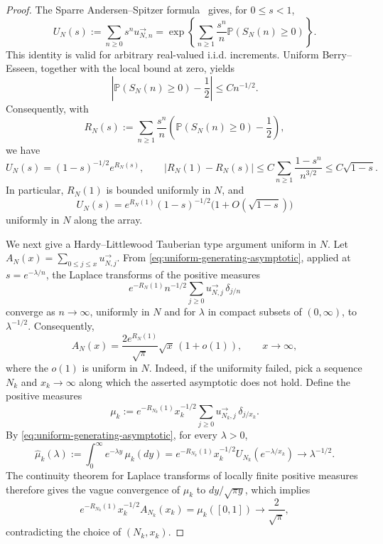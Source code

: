 \documentclass[11pt]{article}
\theoremstyle{plain}
\theoremstyle{definition}
\theoremstyle{remark}
\newcommand{\Pp}{\mathbb P}
\begin{document}
\begin{proof}
The Sparre
Andersen--Spitzer formula~\cite[Equation~(2.2)]{AurzadaSimon} gives, for
\(0\le s<1\),
\begin{equation*}
 U_N(s):=\sum_{n\ge0}s^n u_{N,n}^{\rightarrow}
 =
 \exp\left\{
   \sum_{n\ge1}\frac{s^n}{n}\Pp(S_N(n)\ge0)
 \right\}.
\end{equation*}
This identity is valid for arbitrary real-valued i.i.d. increments.  Uniform Berry--Esseen, together
with the local bound at zero, yields
\begin{equation*}
 \left|\Pp(S_N(n)\ge0)-\frac12\right|
 \le Cn^{-1/2}.
\end{equation*}
Consequently, with
\[
 R_N(s):=\sum_{n\ge1}\frac{s^n}{n}
 \left(\Pp(S_N(n)\ge0)-\frac12\right),
\]
we have
\begin{equation*}
 U_N(s)=(1-s)^{-1/2}e^{R_N(s)},
 \qquad
 |R_N(1)-R_N(s)|
 \le C\sum_{n\ge1}\frac{1-s^n}{n^{3/2}}
 \le C\sqrt{1-s}.
\end{equation*}
In particular, \(R_N(1)\) is bounded uniformly in \(N\), and
\begin{equation}
 U_N(s)=e^{R_N(1)}(1-s)^{-1/2}
 \bigl(1+O(\sqrt{1-s})\bigr)
 \label{eq:uniform-generating-asymptotic}
\end{equation}
uniformly in $N$ along the array.

We next give a Hardy--Littlewood Tauberian type argument uniform in \(N\).
Let
\(A_N(x)=\sum_{0\le j\le x}u_{N,j}^{\rightarrow}\).  From
\eqref{eq:uniform-generating-asymptotic}, applied at
\(s=e^{-\lambda/n}\), the Laplace transforms of the positive measures
\[
 e^{-R_N(1)}n^{-1/2}
 \sum_{j\ge0}u_{N,j}^{\rightarrow}\,\delta_{j/n}
\]
converge as $n\to\infty$, uniformly in $N$ and for \(\lambda\) in compact subsets of
\((0,\infty)\), to \(\lambda^{-1/2}\).  Consequently,
\begin{equation}
 A_N(x)=\frac{2e^{R_N(1)}}{\sqrt\pi}\sqrt{x}\,(1+o(1)),
 \qquad x\to\infty,
 \label{eq:uniform-partial-survival}
\end{equation}
where the \(o(1)\) is uniform in \(N\). Indeed, if the uniformity failed, pick a sequence
$N_k$ and $x_k\to\infty$ along which the asserted asymptotic does not
hold.  Define the positive measures
\[
  \mu_k
  :=
  e^{-R_{N_k}(1)}x_k^{-1/2}
  \sum_{j\ge0}u_{N_k,j}^{\rightarrow}\,\delta_{j/x_k}.
\]
By \eqref{eq:uniform-generating-asymptotic}, for every $\lambda>0$,
\[
  \widehat\mu_k(\lambda)
  :=
  \int_0^\infty e^{-\lambda y}\,\mu_k(dy)
  =
  e^{-R_{N_k}(1)}x_k^{-1/2}
  U_{N_k}(e^{-\lambda/x_k})
  \longrightarrow \lambda^{-1/2}.
\]
The continuity theorem for Laplace transforms of locally finite
positive measures therefore gives the vague convergence of \(\mu_k\) to
\(dy/\sqrt{\pi y}\), which implies
\[
  e^{-R_{N_k}(1)}x_k^{-1/2}A_{N_k}(x_k)
  =\mu_k([0,1])
  \longrightarrow \frac{2}{\sqrt\pi},
\]
contradicting the choice of $(N_k,x_k)$. 


\end{proof}
\end{document}
